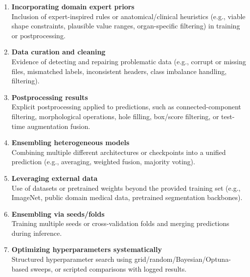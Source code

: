 \begin{enumerate}
    \item \textbf{Incorporating domain expert priors} \\
    Inclusion of expert-inspired rules or anatomical/clinical heuristics (e.g., viable
    shape constraints, plausible value ranges, organ-specific filtering) in training or
    postprocessing.

    \item \textbf{Data curation and cleaning} \\
    Evidence of detecting and repairing problematic data (e.g., corrupt or missing files,
    mismatched labels, inconsistent headers, class imbalance handling, filtering).

    \item \textbf{Postprocessing results} \\
    Explicit postprocessing applied to predictions, such as connected-component filtering,
    morphological operations, hole filling, box/score filtering, or test-time augmentation fusion.

    \item \textbf{Ensembling heterogeneous models} \\
    Combining multiple different architectures or checkpoints into a unified prediction
    (e.g., averaging, weighted fusion, majority voting).

    \item \textbf{Leveraging external data} \\
    Use of datasets or pretrained weights beyond the provided training set (e.g., ImageNet,
    public domain medical data, pretrained segmentation backbones).

    \item \textbf{Ensembling via seeds/folds} \\
    Training multiple seeds or cross-validation folds and merging predictions during
    inference.

    \item \textbf{Optimizing hyperparameters systematically} \\
    Structured hyperparameter search using grid/random/Bayesian/Optuna-based
    sweeps, or scripted comparisons with logged results.
\end{enumerate}
